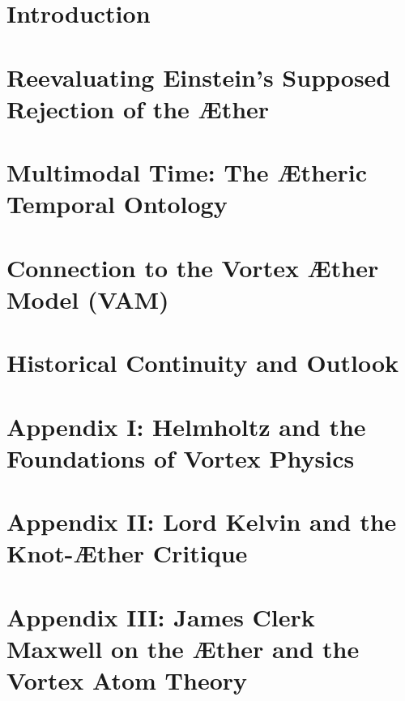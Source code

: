 \documentclass[preprint,notitlepage]{revtex4-2}
\begin{document}
    \section{Introduction}\label{sec:introduction}
    

    \section{Reevaluating Einstein’s Supposed Rejection of the Æther}\label{sec:reevaluating-einsteins-supposed-rejection-of-the-ther}
    

    \section{Multimodal Time: The Ætheric Temporal Ontology}\label{sec:multimodal-time:-the-theric-temporal-ontology}
    

    \section{Connection to the Vortex Æther Model (VAM)}\label{sec:connection_to_VAM}
    

    \section{Historical Continuity and Outlook}\label{sec:historical-continuity-and-outlook}
    

    \appendix

        \section*{Appendix I: Helmholtz and the Foundations of Vortex Physics}
            \label{appendix:helmholtz}
            


        \section*{Appendix II: Lord Kelvin and the Knot-Æther Critique}
            \label{appendix:kelvin}
            


        \section*{Appendix III: James Clerk Maxwell on the Æther and the Vortex Atom Theory}
            \label{appendix:maxwell}
            
\end{document}
